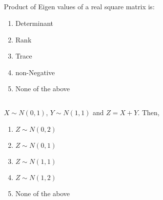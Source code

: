 \begin{frame}
\section{}
  Product of Eigen values of a real square matrix is:
    \begin{enumerate}[label=(\Alph*)]
         \item Determinant
         \item Rank
         \item Trace
         \item non-Negative
         \item None of the above    %
    \end{enumerate}
\end{frame}

\begin{frame}
\section{}
  $X\sim N(0,1)$, $Y\sim N(1,1)$ and $Z=X+Y$. Then,
     \begin{enumerate}[label=(\Alph*)]
         \item $Z\sim N(0,2)$
         \item $Z\sim N(0,1)$
         \item $Z\sim N(1,1)$
         \item $Z\sim N(1,2)$ %
         \item None of the above    %
     \end{enumerate}
\end{frame}

